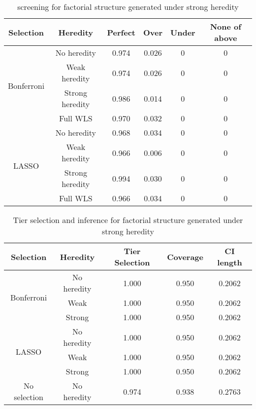 \documentclass[12pt]{article}
\begin{document}
\begin{table}[th]
\centering
\caption{ screening for factorial structure generated under strong heredity}
\label{tab:strong-ms}
\begin{tabular}{cccccc}
\toprule
Selection                   & Heredity        & Perfect & Over  & Under & None of above \\ \hline
\multirow{4}{*}{Bonferroni} & No heredity     & 0.974   & 0.026 & 0     & 0             \\ \cline{2-6} 
                            & Weak heredity   & 0.974   & 0.026 & 0     & 0             \\ \cline{2-6} 
                            & Strong heredity & 0.986   & 0.014 & 0     & 0             \\ \cline{2-6} 
                            & Full WLS        & 0.970   & 0.032 & 0     & 0             \\ \hline
\multirow{4}{*}{LASSO}      & No heredity     & 0.968   & 0.034 & 0     & 0             \\ \cline{2-6} 
                            & Weak heredity   & 0.966   & 0.006 & 0     & 0             \\ \cline{2-6} 
                            & Strong heredity & 0.994   & 0.030 & 0     & 0             \\ \cline{2-6} 
                            & Full WLS        & 0.966   & 0.034 & 0     & 0             \\ \bottomrule
\end{tabular}
\end{table}



\begin{table}[ht]
\centering
\caption{Tier selection and inference for factorial structure generated under strong heredity}
\label{tab:strong-tier}
\begin{tabular}{ccccc}
\toprule
        Selection           & Heredity    & Tier Selection & Coverage & CI length \\ \hline
\multirow{3}{*}{Bonferroni} & No heredity & 1.000          & 0.950    & 0.2062    \\ \cline{2-5} 
                            & Weak        & 1.000          & 0.950    & 0.2062    \\ \cline{2-5} 
                            & Strong      & 1.000          & 0.950    & 0.2062    \\ \hline
\multirow{3}{*}{LASSO}      & No heredity & 1.000          & 0.950    & 0.2062    \\ \cline{2-5} 
                            & Weak        & 1.000          & 0.950    & 0.2062    \\ \cline{2-5} 
                            & Strong      & 1.000          & 0.950    & 0.2062    \\ \hline
No selection                & No heredity & 0.974          & 0.938    & 0.2763    \\ \bottomrule
\end{tabular}
\end{table}
\end{document}
